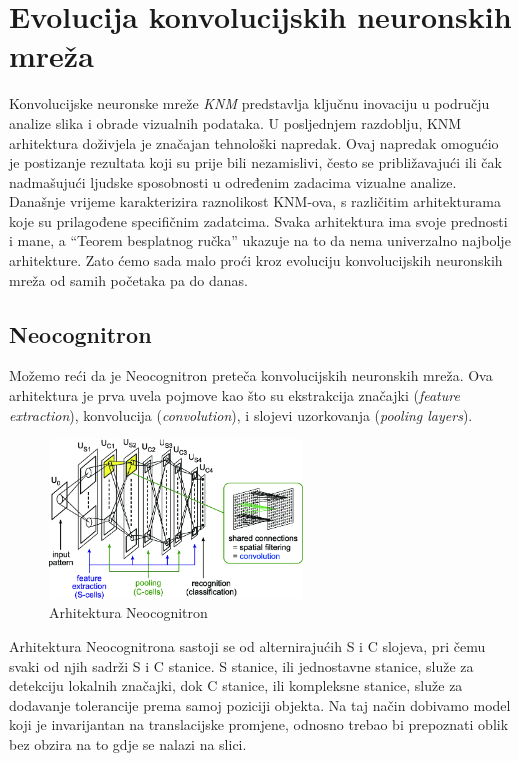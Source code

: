 
\chapter{Evolucija konvolucijskih neuronskih mreža}\label{ch:evolucija-konvolucijskih-neuronskih-mreza}
Konvolucijske neuronske mreže \emph{KNM} predstavlja ključnu inovaciju u području analize slika i obrade vizualnih podataka.
U posljednjem razdoblju, KNM arhitektura doživjela je značajan tehnološki napredak.
Ovaj napredak omogućio je postizanje rezultata koji su prije bili nezamislivi, često se približavajući ili čak nadmašujući ljudske sposobnosti u određenim zadacima vizualne analize.
Današnje vrijeme karakterizira raznolikost KNM-ova, s različitim arhitekturama koje su prilagođene specifičnim zadatcima.
Svaka arhitektura ima svoje prednosti i mane, a \enquote{Teorem besplatnog ručka} ukazuje na to da nema univerzalno najbolje arhitekture.
Zato ćemo sada malo proći kroz evoluciju konvolucijskih neuronskih mreža od samih početaka pa do danas.

\section{Neocognitron}\label{sec:neocognitron}
Možemo reći da je Neocognitron preteča konvolucijskih neuronskih mreža.
Ova arhitektura je prva uvela pojmove kao što su ekstrakcija značajki (\emph{feature extraction}), konvolucija (\emph{convolution}), i slojevi uzorkovanja (\emph{pooling layers}).
\FloatBarrier
\begin{figure}[h]
    \centering
    \includegraphics[width=0.6\textwidth]{images/Neocognitron}
    \caption{Arhitektura Neocognitron}
    \label{fig:slika7}
\end{figure}
\FloatBarrier
Arhitektura Neocognitrona sastoji se od alternirajućih S i C slojeva, pri čemu svaki od njih sadrži S i C stanice.
S stanice, ili jednostavne stanice, služe za detekciju lokalnih značajki, dok C stanice, ili kompleksne stanice, služe za dodavanje tolerancije prema samoj poziciji objekta.
Na taj način dobivamo model koji je invarijantan na translacijske promjene, odnosno trebao bi prepoznati oblik bez obzira na to gdje se nalazi na slici.

